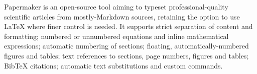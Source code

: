 Papermaker is an open-source tool aiming to typeset professional-quality
scientific articles from mostly-Markdown sources, retaining the option
to use LaTeX where finer control is needed. It supports strict
separation of content and formatting; numbered or unnumbered equations
and inline mathematical expressions; automatic numbering of sections;
floating, automatically-numbered figures and tables; text references to
sections, page numbers, figures and tables; BibTeX citations; automatic
text substitutions and custom commands.
